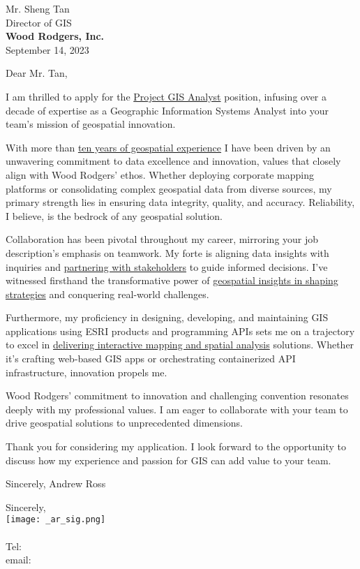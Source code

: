 \documentclass[letterpaper]{article}
\newcommand{\impt}[1]{\uline{#1}}
\begin{document}
\large
Mr. Sheng Tan \\
Director of GIS \\
\textbf{Wood Rodgers, Inc.} \\

\null\hfill September 14, 2023

Dear Mr. Tan,

I am thrilled to apply for the \impt{Project GIS Analyst} position, infusing over a decade
of expertise as a Geographic Information Systems Analyst into your team's
mission of geospatial innovation.

With more than \impt{ten years of geospatial experience} I have been driven by an unwavering
commitment to data excellence and innovation, values that closely align with
Wood Rodgers' ethos. Whether deploying corporate mapping platforms or consolidating
complex geospatial data from diverse sources, my primary strength lies in
ensuring data integrity, quality, and accuracy. Reliability, I believe, is the
bedrock of any geospatial solution.

Collaboration has been pivotal throughout my career, mirroring your job
description's emphasis on teamwork. My forte is aligning data insights with
inquiries and \impt{partnering with stakeholders} to guide informed decisions. I've
witnessed firsthand the transformative power of \impt{geospatial insights in shaping
strategies} and conquering real-world challenges.

Furthermore, my proficiency in designing, developing, and maintaining GIS
applications using ESRI products and programming APIs
sets me on a trajectory to excel in \impt{delivering interactive mapping
and spatial analysis} solutions. Whether it's crafting web-based GIS apps or
orchestrating containerized API infrastructure, innovation propels me.

Wood Rodgers' commitment to innovation and challenging convention resonates
deeply with my professional values. I am eager to collaborate with your team to
drive geospatial solutions to unprecedented dimensions.

Thank you for considering my application. I look forward to the opportunity to
discuss how my experience and passion for GIS can add value to your team.

Sincerely,
Andrew Ross

Sincerely,\\
    \hspace{1em}
    \texttt{[image: \_ar\_sig.png]} \\
    \CVsigname \\
    \small
    Tel: \CVphone \\
    email: \CVemail
\end{document}

